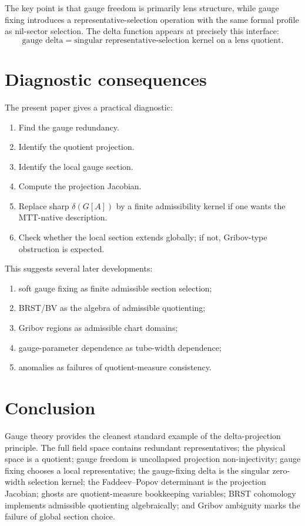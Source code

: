 \documentclass[11pt]{article}
\begin{document}
The key point is that gauge freedom is primarily lens structure, while gauge fixing introduces a representative-selection operation with the same formal profile as nil-sector selection. The delta function appears at precisely this interface:
\[
\boxed{
\text{gauge delta}=\text{singular representative-selection kernel on a lens quotient}.
}
\]

\section{Diagnostic consequences}

The present paper gives a practical diagnostic:

\begin{enumerate}
\item Find the gauge redundancy.
\item Identify the quotient projection.
\item Identify the local gauge section.
\item Compute the projection Jacobian.
\item Replace sharp \(\delta(G[A])\) by a finite admissibility kernel if one wants the MTT-native description.
\item Check whether the local section extends globally; if not, Gribov-type obstruction is expected.
\end{enumerate}

This suggests several later developments:

\begin{enumerate}
\item soft gauge fixing as finite admissible section selection;
\item BRST/BV as the algebra of admissible quotienting;
\item Gribov regions as admissible chart domains;
\item gauge-parameter dependence as tube-width dependence;
\item anomalies as failures of quotient-measure consistency.
\end{enumerate}

\section{Conclusion}

Gauge theory provides the cleanest standard example of the delta-projection principle. The full field space contains redundant representatives; the physical space is a quotient; gauge freedom is uncollapsed projection non-injectivity; gauge fixing chooses a local representative; the gauge-fixing delta is the singular zero-width selection kernel; the Faddeev--Popov determinant is the projection Jacobian; ghosts are quotient-measure bookkeeping variables; BRST cohomology implements admissible quotienting algebraically; and Gribov ambiguity marks the failure of global section choice.
\end{document}
